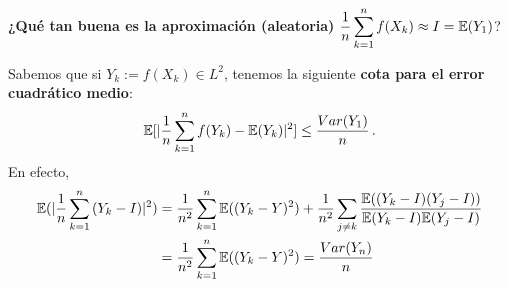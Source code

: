 %
%
\newp \textbf{¿Qué tan buena es la aproximación (aleatoria)} $\displaystyle\frac{1}{n}\sum^n_{k=1}f(X_k)\approx I=\mathbb{E}(Y_1)$?

Sabemos que si $Y_k:=f(X_k)\in L^2$, tenemos la siguiente \textbf{cota para el error cuadrático medio}:
$$ \mathbb{E}[|\displaystyle\frac{1}{n}\sum^n_{k=1}f(Y_k)-\mathbb{E}(Y_k)|^2]\leq\frac{Var(Y_1)}{n} \, .$$
En efecto,
\begin{alignat*}{2}
   \mathbb{E}(|\displaystyle\frac{1}{n}\sum^n_{k=1}{(Y_k-I)}|^2) &  =  \displaystyle\frac{1}{n^2}\sum_{k=1}^n\mathbb{E}((Y_k-Y)^2)+\frac{1}{n^2}\sum_{j\neq k}\frac{\mathbb{E}((Y_k-I)(Y_j-I))}{\mathbb{E}(Y_k-I)\mathbb{E}(Y_j-I)} \\
     & = \displaystyle\frac{1}{n^2}\sum_{k=1}^n\mathbb{E}((Y_k-Y)^2)=\frac{Var(Y_n)}{n}
\end{alignat*}


